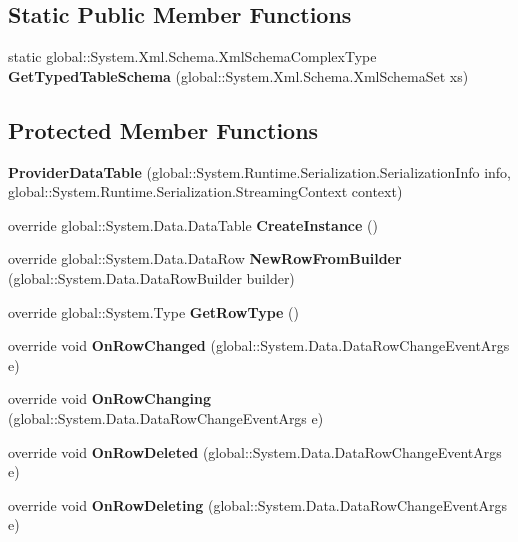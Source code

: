 \subsection*{Static Public Member Functions}
\begin{DoxyCompactItemize}
\item 
\mbox{\label{class_a_f_h___scheduler_1_1_home_inspection_db_data_set_1_1_provider_data_table_a80e5a8babdf24bb56f603c9d8d8f9f56}} 
static global\+::\+System.\+Xml.\+Schema.\+Xml\+Schema\+Complex\+Type {\bfseries Get\+Typed\+Table\+Schema} (global\+::\+System.\+Xml.\+Schema.\+Xml\+Schema\+Set xs)
\end{DoxyCompactItemize}
\subsection*{Protected Member Functions}
\begin{DoxyCompactItemize}
\item 
\mbox{\label{class_a_f_h___scheduler_1_1_home_inspection_db_data_set_1_1_provider_data_table_a8c4c6b00219adc7aaafbe81aad4507b2}} 
{\bfseries Provider\+Data\+Table} (global\+::\+System.\+Runtime.\+Serialization.\+Serialization\+Info info, global\+::\+System.\+Runtime.\+Serialization.\+Streaming\+Context context)
\item 
\mbox{\label{class_a_f_h___scheduler_1_1_home_inspection_db_data_set_1_1_provider_data_table_acdcf7ac68d6fd70b46df021fd91812c3}} 
override global\+::\+System.\+Data.\+Data\+Table {\bfseries Create\+Instance} ()
\item 
\mbox{\label{class_a_f_h___scheduler_1_1_home_inspection_db_data_set_1_1_provider_data_table_af0b33efae11cbc69998ce53f269da8cc}} 
override global\+::\+System.\+Data.\+Data\+Row {\bfseries New\+Row\+From\+Builder} (global\+::\+System.\+Data.\+Data\+Row\+Builder builder)
\item 
\mbox{\label{class_a_f_h___scheduler_1_1_home_inspection_db_data_set_1_1_provider_data_table_a7cb3dad916275879af8984ef098b42ff}} 
override global\+::\+System.\+Type {\bfseries Get\+Row\+Type} ()
\item 
\mbox{\label{class_a_f_h___scheduler_1_1_home_inspection_db_data_set_1_1_provider_data_table_a1d417efaaeb29b9e2ce95259e86bc8a2}} 
override void {\bfseries On\+Row\+Changed} (global\+::\+System.\+Data.\+Data\+Row\+Change\+Event\+Args e)
\item 
\mbox{\label{class_a_f_h___scheduler_1_1_home_inspection_db_data_set_1_1_provider_data_table_a78e48ed2254ac09a1adf19894198b4d5}} 
override void {\bfseries On\+Row\+Changing} (global\+::\+System.\+Data.\+Data\+Row\+Change\+Event\+Args e)
\item 
\mbox{\label{class_a_f_h___scheduler_1_1_home_inspection_db_data_set_1_1_provider_data_table_acb56849b8690fc0f0d31b66414945d68}} 
override void {\bfseries On\+Row\+Deleted} (global\+::\+System.\+Data.\+Data\+Row\+Change\+Event\+Args e)
\item 
\mbox{\label{class_a_f_h___scheduler_1_1_home_inspection_db_data_set_1_1_provider_data_table_a911533b1671222411c83f1ede3442b43}} 
override void {\bfseries On\+Row\+Deleting} (global\+::\+System.\+Data.\+Data\+Row\+Change\+Event\+Args e)
\end{DoxyCompactItemize}
